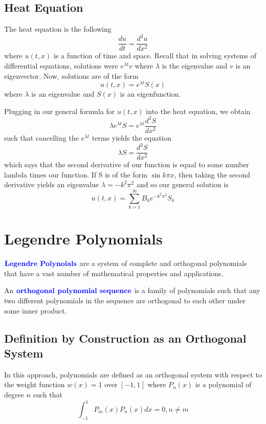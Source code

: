 \documentclass[12pt]{scrartcl}
\begin{document}
\subsection{Heat Equation}

The heat equation is the following
\[\frac{du}{dt} = \frac{d^2u}{dx^2}\] where $u(t, x)$ is a function of time and space. Recall that in solving systems
of differential equations, solutions were $e^{\lambda t}v$ where $\lambda$ is
the eigenvalue and $v$ is an eigenvector. Now, solutions are of the form
\[u(t,x) = e^{\lambda t}S(x)\] where $\lambda$ is an eigenvalue and $S(x)$ is an eigenfunction.

Plugging in our general formula for $u(t,x)$ into the heat equation, we obtain
\[\lambda e^{\lambda t}S = e^{\lambda t}\frac{d^2S}{dx^2}\]
such that cancelling the $e^{\lambda t}$ terms yields the equation
\[\lambda S = \frac{d^2S}{dx^2}\] which says that the second derivative of our function is equal to some number
lambda times our function. If S is of the form $\sin k\pi x$, then taking the
second derivative yields an eigenvalue $\lambda = -k^2\pi^2$ and so our general
solution is
\[u(t,x) = \sum_{k=1}^\infty B_ke^{-k^2\pi^2}S_k\]

\section{Legendre Polynomials}

\begin{definition}
    $\textbf{\color{blue} Legendre Polynoials}$ are a system of complete and orthogonal polynomials that have a vast number of mathematical properties and applications.
\end{definition}

\begin{definition}
    An $\textbf{\color{blue} orthogonal polynomial sequence}$ is a family of polynomials such that any two different polynomials in the sequence are orthogonal to each other under some inner product.
\end{definition}

\subsection{Definition by Construction as an Orthogonal System}

\begin{definition}
    In this approach, polynomials are defined as an orthogonal system with respect to the weight function $w(x) = 1$ over $[-1, 1]$ where $P_n(x)$ is a polynomial of degree $n$ such that
    \[\int_{-1}^1 P_m(x)P_n(x) dx = 0, n \neq m\]
\end{definition}
\end{document}
